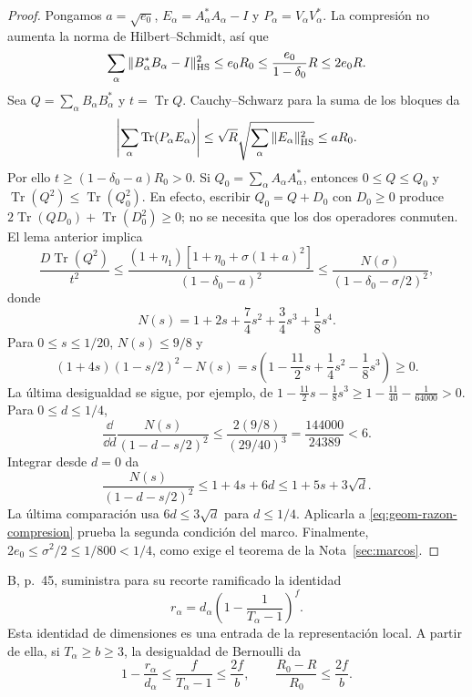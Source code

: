 \begin{proof}
Pongamos $a=\sqrt{e_0}$,
$E_\alpha=A_\alpha^*A_\alpha-I$ y
$P_\alpha=V_\alpha V_\alpha^*$.
La compresión no aumenta la norma de Hilbert--Schmidt, así que
\[
 \sum_\alpha\|B_\alpha^*B_\alpha-I\|_{\rm HS}^2
 \le e_0R_0\le\frac{e_0}{1-\delta_0}R\le2e_0R.
\]
Sea $Q=\sum_\alpha B_\alpha B_\alpha^*$ y $t=\operatorname{Tr}Q$.
Cauchy--Schwarz para la suma de los bloques da
\[
 \left|\sum_\alpha\operatorname{Tr}(P_\alpha E_\alpha)\right|
 \le\sqrt R\sqrt{\sum_\alpha\|E_\alpha\|_{\rm HS}^2}
 \le aR_0.
\]
Por ello $t\ge(1-\delta_0-a)R_0>0$.
Si $Q_0=\sum_\alpha A_\alpha A_\alpha^*$, entonces
$0\le Q\le Q_0$ y
$\operatorname{Tr}(Q^2)\le\operatorname{Tr}(Q_0^2)$.
En efecto, escribir $Q_0=Q+D_0$ con $D_0\ge0$ produce
$2\operatorname{Tr}(QD_0)+\operatorname{Tr}(D_0^2)\ge0$;
no se necesita que los dos operadores conmuten.
El lema anterior implica
\begin{equation}
 \frac{D\operatorname{Tr}(Q^2)}{t^2}
 \le\frac{(1+\eta_1)[1+\eta_0+\sigma(1+a)^2]}
              {(1-\delta_0-a)^2}
 \le\frac{N(\sigma)}{(1-\delta_0-\sigma/2)^2},
 \label{eq:geom-razon-compresion}
\end{equation}
donde
\[
 N(s)=1+2s+\frac74s^2+\frac34s^3+\frac18s^4.
\]
Para $0\le s\le1/20$, $N(s)\le9/8$ y
\[
 (1+4s)(1-s/2)^2-N(s)
 =s\left(1-\frac{11}{2}s+\frac14s^2-\frac18s^3\right)\ge0.
\]
La última desigualdad se sigue, por ejemplo, de
$1-\frac{11}{2}s-\frac18s^3
\ge1-\frac{11}{40}-\frac1{64000}>0$.
Para $0\le d\le1/4$,
\[
 \frac{\dd}{\dd d}\frac{N(s)}{(1-d-s/2)^2}
 \le\frac{2(9/8)}{(29/40)^3}
 =\frac{144000}{24389}<6.
\]
Integrar desde $d=0$ da
\[
 \frac{N(s)}{(1-d-s/2)^2}
 \le1+4s+6d\le1+5s+3\sqrt d.
\]
La última comparación usa $6d\le3\sqrt d$ para $d\le1/4$.
Aplicarla a \eqref{eq:geom-razon-compresion} prueba la
segunda condición del marco.
Finalmente, $2e_0\le\sigma^2/2\le1/800<1/4$, como exige
el teorema de la Nota~\ref{sec:marcos}.
\end{proof}

B, p.~45, suministra para su recorte ramificado la identidad
\[
 r_\alpha=d_\alpha
       \left(1-\frac1{T_\alpha-1}\right)^f.
\]
Esta identidad de dimensiones es una entrada de la representación
local. A partir de ella, si $T_\alpha\ge b\ge3$, la desigualdad
de Bernoulli da
\begin{equation}
 1-\frac{r_\alpha}{d_\alpha}
 \le\frac{f}{T_\alpha-1}\le\frac{2f}{b},
 \qquad
 \frac{R_0-R}{R_0}\le\frac{2f}{b}.
 \label{eq:geom-rango-ramificado}
\end{equation}

